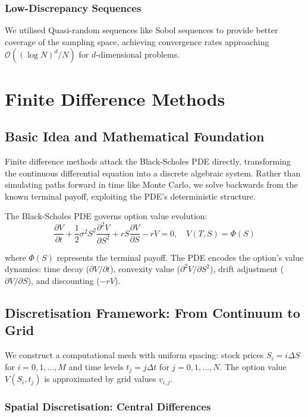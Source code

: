 \documentclass[11pt,a4paper]{article}
\begin{document}
\subsubsection{Low-Discrepancy Sequences}
We utilised Quasi-random sequences like Sobol sequences to provide better coverage of the sampling space, achieving convergence rates approaching $\mathcal{O}((\log N)^d/N)$ for $d$-dimensional problems.

\section{Finite Difference Methods}

\subsection{Basic Idea and Mathematical Foundation}

Finite difference methods attack the Black-Scholes PDE directly, transforming the continuous differential equation into a discrete algebraic system. Rather than simulating paths forward in time like Monte Carlo, we solve backwards from the known terminal payoff, exploiting the PDE's deterministic structure.

The Black-Scholes PDE governs option value evolution:
\begin{equation}
\frac{\partial V}{\partial t} + \frac{1}{2}\sigma^2 S^2 \frac{\partial^2 V}{\partial S^2} + rS\frac{\partial V}{\partial S} - rV = 0, \quad V(T,S) = \Phi(S)
\end{equation}

where $\Phi(S)$ represents the terminal payoff. The PDE encodes the option's value dynamics: time decay ($\partial V/\partial t$), convexity value ($\partial^2 V/\partial S^2$), drift adjustment ($\partial V/\partial S$), and discounting ($-rV$).

\subsection{Discretisation Framework: From Continuum to Grid}

We construct a computational mesh with uniform spacing: stock prices $S_i = i\Delta S$ for $i = 0,1,\ldots,M$ and time levels $t_j = j\Delta t$ for $j = 0,1,\ldots,N$. The option value $V(S_i, t_j)$ is approximated by grid values $v_{i,j}$.

\subsubsection{Spatial Discretisation: Central Differences}
\end{document}
